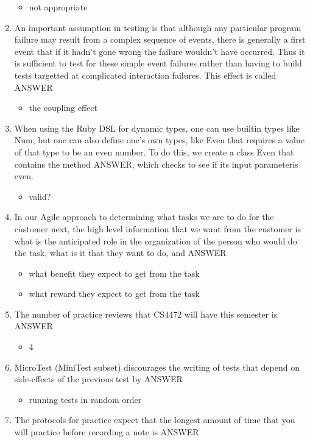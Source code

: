 \documentclass{exam}
\begin{document}
\begin{enumerate}
\begin{itemize}
\item not appropriate
\end{itemize}
\item An important assumption in testing is that although any particular program failure may result from a complex sequence of events, there is generally a first event that if it hadn't gone wrong the failure wouldn't have occurred.  Thus it is sufficient to test for these simple event failures rather than having to build tests targetted at complicated interaction failures.  This effect is called ANSWER 
\begin{itemize}
\item the coupling effect
\end{itemize}
\item When using the Ruby DSL for dynamic types, one can use builtin types like Num, but one can also define one's own types, like Even that requires a value of that type to be an even number.  To do this, we create a class Even that contains the method ANSWER, which checks to see if its input parameteris even.
\begin{itemize}
\item valid?
\end{itemize}
\item In our Agile approach to determining what tasks we are to do for the customer next, the high level information that we want from the customer is what is the anticipated role in the organization of the person who would do the task, what is it that they want to do, and ANSWER
\begin{itemize}
\item what benefit they expect to get from the task
\item what reward they expect to get from the task
\end{itemize}
\item The number of practice reviews that CS4472 will have this semester is ANSWER
\begin{itemize}
\item 4
\end{itemize}
\item MicroTest (MiniTest subset) discourages the writing of tests that depend on side-effects of the previous test by ANSWER
\begin{itemize}
\item running tests in random order
\end{itemize}
\item The protocols for practice expect that the longest amount of time that you will practice before recording a note is ANSWER

\end{enumerate}
\end{document}
